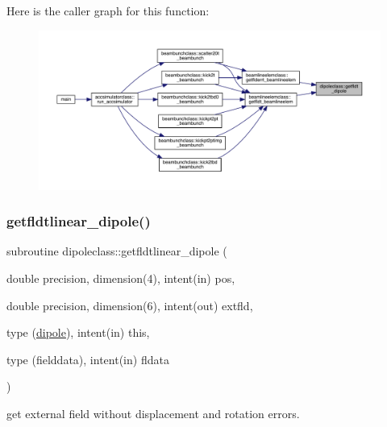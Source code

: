 Here is the caller graph for this function\+:\nopagebreak
\begin{figure}[H]
\begin{center}
\leavevmode
\includegraphics[width=350pt]{namespacedipoleclass_af86cd228552505ad1c64928bb918f500_icgraph}
\end{center}
\end{figure}
\mbox{\label{namespacedipoleclass_a9913f632a53ea9454402dd0a7932d70a}} 
\subsubsection{\texorpdfstring{getfldtlinear\_dipole()}{getfldtlinear\_dipole()}}
{\footnotesize\ttfamily subroutine dipoleclass\+::getfldtlinear\+\_\+dipole (\begin{DoxyParamCaption}\item[{double precision, dimension(4), intent(in)}]{pos,  }\item[{double precision, dimension(6), intent(out)}]{extfld,  }\item[{type (\mbox{\hyperlink{namespacedipoleclass_structdipoleclass_1_1dipole}{dipole}}), intent(in)}]{this,  }\item[{type (fielddata), intent(in)}]{fldata }\end{DoxyParamCaption})}



get external field without displacement and rotation errors. 

\mbox{\label{namespacedipoleclass_a2897764d70f631133a41bf4ae8a1844a}} 
